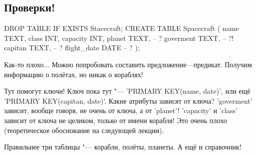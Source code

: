 \subsection{Проверки!}
\begin{sqlcode}
DROP TABLE IF EXISTS Stacecraft;
CREATE TABLE Spacecraft (
	name TEXT,
	class INT,
	capacity INT,
	planet TEXT, -- ?
	goverment TEXT, -- ?!
	capitan TEXT, -- ?
	flight_date DATE -- ?
);
\end{sqlcode}
Как-то плохо...
Можно попробовать составить предложение---предикат. Получим информацию о полётах, но никак о кораблях!

Тут помогут ключи!
Ключ пока тут "--- \sql'PRIMARY KEY(name, date)', или ещё \\\sql'PRIMARY KEY(capitan, date)'.
Какие атрибуты зависят от ключа? \sql'goverment' зависит, вообще говоря, не очень от ключа, а от \sql'planet'!
\sql'capacity' и \sql'class' зависит от ключа не целиком, только от имени корабля!
Это очень плохо (теоретическое обоснование на следующей лекции).

Правильнее три таблицы "--- корабли, полёты, планеты. А ещё и справочник!
